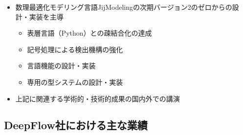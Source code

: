\documentclass[a4j]{ltjsarticle}
\begin{document}
\begin{refsection}
\begin{itemize}
  \item 数理最適化モデリング言語JijModelingの次期バージョン2のゼロからの設計・実装を主導
    \begin{itemize}
      \item 表層言語（Python）との疎結合化の達成
      \item 記号処理による検出機構の強化
      \item 言語機能の設計・実装
      \item 専用の型システムの設計・実装
    \end{itemize}
  \item 上記に関連する学術的・技術的成果の国内外での講演
\end{itemize}

\subsection*{DeepFlow社における主な業績}


\end{refsection}
\end{document}
